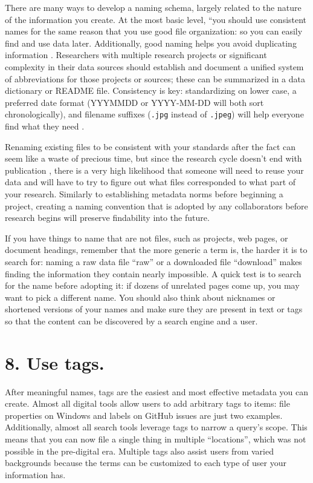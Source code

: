 \documentclass[10pt,letterpaper]{article}
\newcommand{\rulemajor}[1]{\section*{#1}}
\begin{document}
There are many ways to develop a naming schema, largely related to the nature of
the information you create. At the most basic level, ``you should use consistent
names for the same reason that you use good file organization: so you can easily
find and use data later. Additionally, good naming helps you avoid duplicating
information \cite{Briney2015}. Researchers with multiple research projects or
significant complexity in their data sources should establish and document a
unified system of abbreviations for those projects or sources; these can be
summarized in a data dictionary or README file. Consistency is key:
standardizing on lower case, a preferred date format (YYYMMDD or YYYY-MM-DD will
both sort chronologically), and filename suffixes (\texttt{.jpg} instead of
\texttt{.jpeg}) will help everyone find what they need \cite{Wilson2014,Wilson2017}.

Renaming existing files to be consistent with your standards after the fact can
seem like a waste of precious time, but since the research cycle doesn't end
with publication \cite{Briney2015}, there is a very high likelihood that someone
will need to reuse your data and will have to try to figure out what files
corresponded to what part of your research.
Similarly to establishing metadata norms before beginning a project, creating a naming convention that is adopted by any collaborators before research begins will preserve findability into the future.

If you have things to name that are not files, such as projects, web pages, or
document headings, remember that the more generic a term is, the harder it is to
search for: naming a raw data file ``raw'' or a downloaded file ``download''
makes finding the information they contain nearly impossible. A quick test is to
search for the name before adopting it: if dozens of unrelated pages come up,
you may want to pick a different name. You should also think about nicknames or
shortened versions of your names and make sure they are present in text or tags
so that the content can be discovered by a search engine and a user.

\rulemajor{8. Use tags.}

After meaningful names, tags are the easiest and most effective metadata you can
create.  Almost all digital tools allow users to add arbitrary tags to items:
file properties on Windows and labels on GitHub issues are just two examples.
Additionally, almost all search tools leverage tags to narrow a query's
scope. This means that you can now file a single thing in multiple
``locations'', which was not possible in the pre-digital era. Multiple tags also
assist users from varied backgrounds because the terms can be customized to each
type of user your information has.
\end{document}
